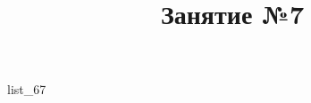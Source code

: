 \documentclass[12pt, a4paper]{article}
\begin{document}
	\title{Занятие №7}
	{list_67}
\end{document}
